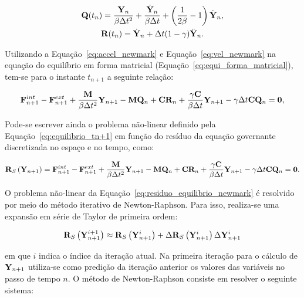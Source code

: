 \begin{gather}
	\mathbf{Q}(t_n) = \frac{\mathbf{Y}_n}{\beta \Delta t^2} + \frac{\dot{\mathbf{Y}}_n}{\beta \Delta t} + \left(\frac{1}{2\beta} -1 \right)\ddot{\mathbf{Y}}_n,\label{eq:Qn}\\
	\mathbf{R}(t_n) = \dot{\mathbf{Y}}_n+\Delta t(1-\gamma)\ddot{\mathbf{Y}}_n.\label{eq:Rn}
\end{gather}

Utilizando a Equação~\eqref{eq:accel_newmark} e Equação~\eqref{eq:vel_newmark} na equação do equilíbrio em forma matricial (Equação~\eqref{eq:equi_forma_matricial}), tem-se para o instante $t_{n+1}$ a seguinte relação:

\begin{gather}
	\mathbf{F}^{int}_{n+1}- \mathbf{F}^{ext}_{n+1} + \frac{\mathbf{M}}{\beta \Delta t^2} \mathbf{Y}_{n+1}-\mathbf{M} \mathbf{Q}_n+ \mathbf{C}\mathbf{R}_n + \frac{\gamma \mathbf{C}}{\beta \Delta t}\mathbf{Y}_{n+1} - \gamma\Delta t \mathbf{C}\mathbf{Q}_n = \mathbf{0},
	\label{eq:equilibrio_tn+1}
\end{gather}

Pode-se escrever ainda o problema não-linear definido pela Equação~\eqref{eq:equilibrio_tn+1} em função do resíduo da equação governante
discretizada no espaço e no tempo, como:

\begin{gather}
	\mathbf{R}_S\left(\mathbf{Y}_{n+1}\right) = \mathbf{F}^{int}_{n+1}- \mathbf{F}^{ext}_{n+1} + \frac{\mathbf{M}}{\beta \Delta t^2} \mathbf{Y}_{n+1}-\mathbf{M} \mathbf{Q}_n+ \mathbf{C}\mathbf{R}_n + \frac{\gamma \mathbf{C}}{\beta \Delta t}\mathbf{Y}_{n+1} - \gamma\Delta t \mathbf{C}\mathbf{Q}_n= \mathbf{0}.
	\label{eq:residuo_equilibrio_newmark}
\end{gather}

O problema não-linear da Equação~\eqref{eq:residuo_equilibrio_newmark} é resolvido por meio do método iterativo de Newton-Raphson. Para isso, realiza-se uma expansão em série de Taylor de primeira ordem:

\begin{gather}
	\mathbf{R}_S\left(\mathbf{Y}_{n+1}^{i+1}\right) \approx \mathbf{R}_S\left(\mathbf{Y}_{n+1}^{i}\right) + \Delta\mathbf{R}_S\left(\mathbf{Y}_{n+1}^{i}\right)\Delta\mathbf{Y}_{n+1}^{i} 
\end{gather}

\noindent em que $i$ indica o índice da iteração atual. Na primeira iteração para o cálculo de $\mathbf{Y}_{n+1}$ utiliza-se como predição da iteração anterior os valores das variáveis no passo de tempo $n$. O método de Newton-Raphson consiste em resolver o seguinte sistema:

